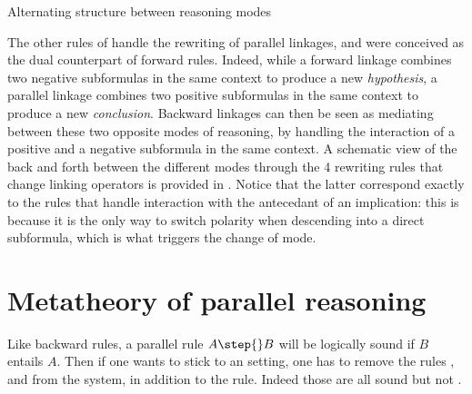 \begin{marginfigure}
  \begin{center}
  \end{center}
  \caption{Alternating structure between reasoning modes}
\end{marginfigure}

The other rules of  handle the rewriting of parallel linkages,
and were conceived as the dual counterpart of forward rules. Indeed, while a
forward linkage combines two negative subformulas in the same context to produce
a new \emph{hypothesis}, a parallel linkage combines two positive subformulas in
the same context to produce a new \emph{conclusion}. Backward linkages can then
be seen as mediating between these two opposite modes of reasoning, by handling
the interaction of a positive and a negative subformula in the same context. A
schematic view of the back and forth between the different modes through the 4
rewriting rules that change linking operators is provided in
. Notice that the latter correspond exactly to the rules
that handle interaction with the antecedant of an implication: this is because
it is the only way to switch polarity when descending into a direct subformula,
which is what triggers the change of mode.

\section{Metatheory of parallel reasoning}

Like backward rules, a parallel rule $A \step{} B$ will be logically sound if $B$
entails $A$. Then if one wants to stick to an  setting, one has to
remove the rules {}, {} and {} from the system, in addition to the {} rule. Indeed those
are all sound  but not .


